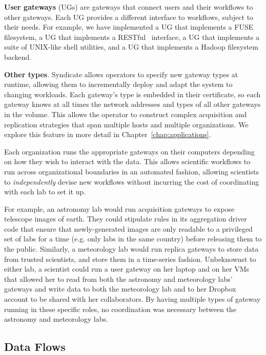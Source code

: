 \textbf{User gateways} (UGs) are gateways that connect users and their workflows
to other gateways.  Each UG provides a different interface to workflows, subject
to their needs.  For example, we have implemented a UG that implements a
FUSE~\cite{fuse} filesystem, a UG that implements a RESTful~\cite{rest}
interface, a UG that implements a suite of UNIX-like shell utilities, and a UG
that implements a Hadoop filesystem~\cite{hadoop} backend.

\textbf{Other types}.  Syndicate allows operators to specify new gateway types at runtime, allowing
them to incrementally deploy and adapt the system to changing workloads.  Each
gateway's type is embedded in their certificate, so each gateway knows at all
times the network addresses and types of all other gateways in the volume.
This allows the operator to construct complex acquisition and replication
strategies that span multiple hosts and multiple organizations.
We explore this feature in more detail in Chapter~\ref{chap:applications}.

Each organization runs the appropriate gateways on their computers depending on
how they wish to interact with the data.  This allows scientific workflows to
run across organizational boundaries in an automated fashion, allowing
scientists to \emph{independently} devise new workflows without incurring the
cost of coordinating with each lab to set it up.

For example, an astronomy lab would
run acquisition gateways to expose telescope images of earth.  They could stipulate rules
in its aggregation driver code that ensure that newly-generated images are only
readable to a privileged set of labs for a time (e.g. only labs in the same
country) before releasing them to the public.  Similarly, a meteorology
lab would run replica gateways to store data from trusted scientists, and
store them in a time-series fashion.  Unbeknownst to either lab, a scientist could
run a user gateway on her laptop and on her VMs that allowed her to read from both the
astronomy and meteorology labs' gateways and write data to both the meteorology
lab and to her Dropbox account to be shared with her collaborators.  By having
multiple types of gateway running in these specific roles, no coordination was
necessary between the astronomy and meteorology labs.

\subsection{Data Flows}

